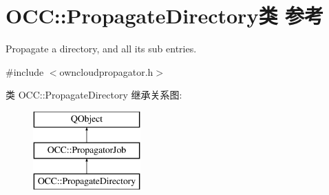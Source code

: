 \hypertarget{class_o_c_c_1_1_propagate_directory}{}\section{O\+CC\+:\+:Propagate\+Directory类 参考}
\label{class_o_c_c_1_1_propagate_directory}


Propagate a directory, and all its sub entries.  




{\ttfamily \#include $<$owncloudpropagator.\+h$>$}

类 O\+CC\+:\+:Propagate\+Directory 继承关系图\+:\begin{figure}[H]
\begin{center}
\leavevmode
\includegraphics[height=3.000000cm]{class_o_c_c_1_1_propagate_directory}
\end{center}
\end{figure}
